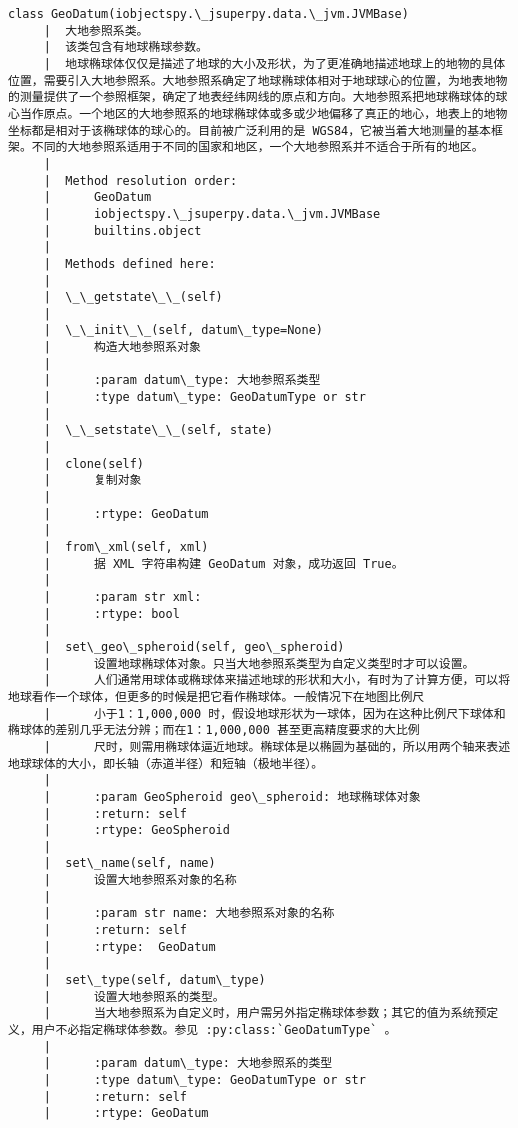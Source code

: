 \documentclass[11pt]{article}
\begin{document}
\begin{Verbatim}[commandchars=\\\{\}]
    class GeoDatum(iobjectspy.\_jsuperpy.data.\_jvm.JVMBase)
     |  大地参照系类。
     |  该类包含有地球椭球参数。
     |  地球椭球体仅仅是描述了地球的大小及形状，为了更准确地描述地球上的地物的具体位置，需要引入大地参照系。大地参照系确定了地球椭球体相对于地球球心的位置，为地表地物的测量提供了一个参照框架，确定了地表经纬网线的原点和方向。大地参照系把地球椭球体的球心当作原点。一个地区的大地参照系的地球椭球体或多或少地偏移了真正的地心，地表上的地物坐标都是相对于该椭球体的球心的。目前被广泛利用的是 WGS84，它被当着大地测量的基本框架。不同的大地参照系适用于不同的国家和地区，一个大地参照系并不适合于所有的地区。
     |  
     |  Method resolution order:
     |      GeoDatum
     |      iobjectspy.\_jsuperpy.data.\_jvm.JVMBase
     |      builtins.object
     |  
     |  Methods defined here:
     |  
     |  \_\_getstate\_\_(self)
     |  
     |  \_\_init\_\_(self, datum\_type=None)
     |      构造大地参照系对象
     |      
     |      :param datum\_type: 大地参照系类型
     |      :type datum\_type: GeoDatumType or str
     |  
     |  \_\_setstate\_\_(self, state)
     |  
     |  clone(self)
     |      复制对象
     |      
     |      :rtype: GeoDatum
     |  
     |  from\_xml(self, xml)
     |      据 XML 字符串构建 GeoDatum 对象，成功返回 True。
     |      
     |      :param str xml:
     |      :rtype: bool
     |  
     |  set\_geo\_spheroid(self, geo\_spheroid)
     |      设置地球椭球体对象。只当大地参照系类型为自定义类型时才可以设置。
     |      人们通常用球体或椭球体来描述地球的形状和大小，有时为了计算方便，可以将地球看作一个球体，但更多的时候是把它看作椭球体。一般情况下在地图比例尺
     |      小于1：1,000,000 时，假设地球形状为一球体，因为在这种比例尺下球体和椭球体的差别几乎无法分辨；而在1：1,000,000 甚至更高精度要求的大比例
     |      尺时，则需用椭球体逼近地球。椭球体是以椭圆为基础的，所以用两个轴来表述地球球体的大小，即长轴（赤道半径）和短轴（极地半径）。
     |      
     |      :param GeoSpheroid geo\_spheroid: 地球椭球体对象
     |      :return: self
     |      :rtype: GeoSpheroid
     |  
     |  set\_name(self, name)
     |      设置大地参照系对象的名称
     |      
     |      :param str name: 大地参照系对象的名称
     |      :return: self
     |      :rtype:  GeoDatum
     |  
     |  set\_type(self, datum\_type)
     |      设置大地参照系的类型。
     |      当大地参照系为自定义时，用户需另外指定椭球体参数；其它的值为系统预定义，用户不必指定椭球体参数。参见 :py:class:`GeoDatumType` 。
     |      
     |      :param datum\_type: 大地参照系的类型
     |      :type datum\_type: GeoDatumType or str
     |      :return: self
     |      :rtype: GeoDatum

\end{Verbatim}
\end{document}
